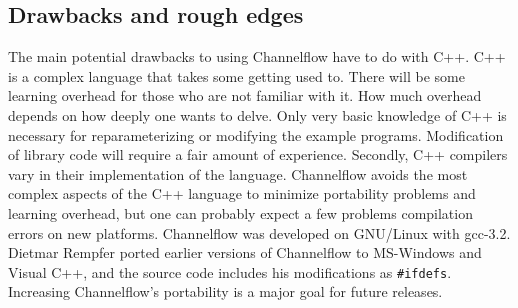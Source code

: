 \documentclass{article}[12pt]
\begin{document}



\subsection{Drawbacks and rough edges}

The main potential drawbacks to using Channelflow have to do with C++.
C++ is a complex language that takes some getting used to. There will
be some learning overhead for those who are not familiar with it. How
much overhead depends on how deeply one wants to delve. Only very
basic knowledge of C++ is necessary for reparameterizing or modifying
the example programs. Modification of library code will require a fair
amount of experience. Secondly, C++ compilers vary in their
implementation of the language. Channelflow avoids the most complex
aspects of the C++ language to minimize portability problems and
learning overhead, but one can probably expect a few problems
compilation errors on new platforms. Channelflow was developed on
GNU/Linux with gcc-3.2. Dietmar Rempfer ported earlier versions of
Channelflow to MS-Windows and Visual C++, and the source code includes
his modifications as {\tt \#ifdefs}. Increasing Channelflow's
portability is a major goal for future releases.
\end{document}

